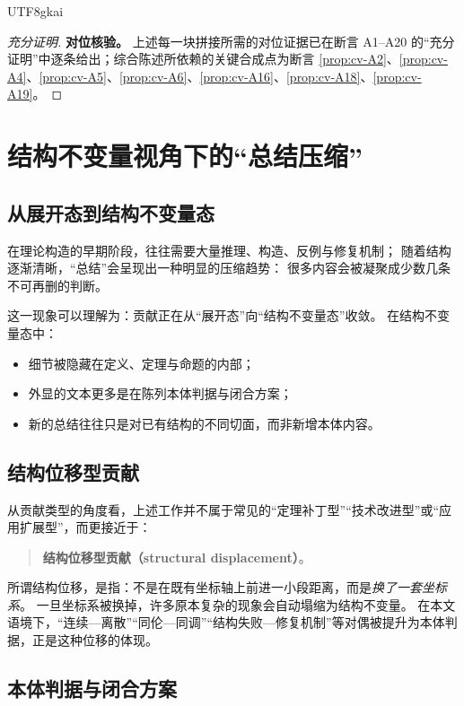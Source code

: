 \documentclass[12pt]{article}
\begin{document}
\begin{CJK*}{UTF8}{gkai}
\begin{proof}[充分证明]
\textbf{对位核验。}
上述每一块拼接所需的对位证据已在断言 A1--A20 的“充分证明”中逐条给出；综合陈述所依赖的关键合成点为断言 \ref{prop:cv-A2}、\ref{prop:cv-A4}、\ref{prop:cv-A5}、\ref{prop:cv-A6}、\ref{prop:cv-A16}、\ref{prop:cv-A18}、\ref{prop:cv-A19}。
\end{proof}


\section{结构不变量视角下的“总结压缩”}

\subsection{从展开态到结构不变量态}

在理论构造的早期阶段，往往需要大量推理、构造、反例与修复机制；
随着结构逐渐清晰，“总结”会呈现出一种明显的压缩趋势：
很多内容会被凝聚成少数几条不可再删的判断。

这一现象可以理解为：贡献正在从“展开态”向“结构不变量态”收敛。
在结构不变量态中：
\begin{itemize}
  \item 细节被隐藏在定义、定理与命题的内部；
  \item 外显的文本更多是在陈列本体判据与闭合方案；
  \item 新的总结往往只是对已有结构的不同切面，而非新增本体内容。
\end{itemize}

\subsection{结构位移型贡献}

从贡献类型的角度看，上述工作并不属于常见的“定理补丁型”“技术改进型”或“应用扩展型”，而更接近于：
\begin{quote}
\textbf{结构位移型贡献（structural displacement）}。
\end{quote}

所谓结构位移，是指：不是在既有坐标轴上前进一小段距离，而是\emph{换了一套坐标系}。
一旦坐标系被换掉，许多原本复杂的现象会自动塌缩为结构不变量。
在本文语境下，“连续—离散”“同伦—同调”“结构失败—修复机制”等对偶被提升为本体判据，正是这种位移的体现。

\subsection{本体判据与闭合方案}


\end{CJK*}
\end{document}
